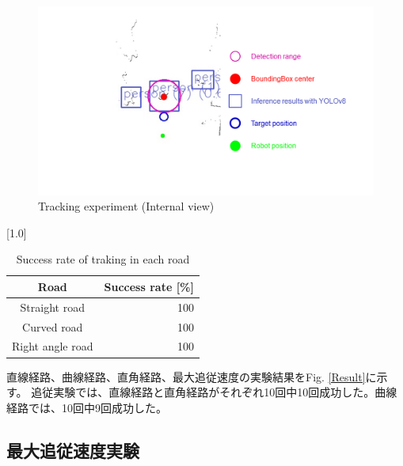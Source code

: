 \begin{figure}[h]
  \begin{center}
  \includegraphics[width=170mm,clip]{figure/Tracking-experiment-Internal-view.png}
  \caption{Tracking experiment (Internal view)}
  \label{Tracking experiment (Internal view)}
  \end{center}
\end{figure}

\begin{table}[h]
    \begin{center}
      \caption{{Success rate of traking in each road}\label{Success rate of traking in each road}}
      \scalebox{1.2}[1.0]{
        \begin{tabular}{c|r} \hline
          Road & Success rate [\%] \\ \hline
          Straight road & 100 \\
          Curved road & 100 \\
          Right angle road & 100 \\ \hline
        \end{tabular}
      }
    \end{center}
\end{table}

直線経路、曲線経路、直角経路、最大追従速度の実験結果をFig. \ref{Result}に示す。
追従実験では、直線経路と直角経路がそれぞれ10回中10回成功した。曲線経路では、10回中9回成功した。

\subsection{最大追従速度実験}

